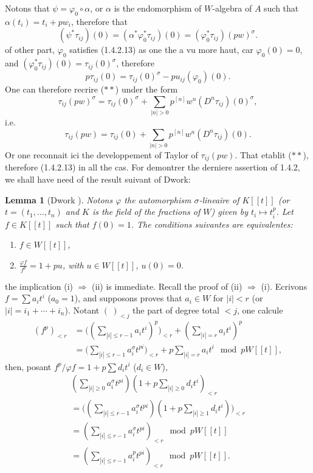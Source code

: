 \documentclass[12pt,a4paper]{article}
\theoremstyle{plain}
\newtheorem{lemma}[theorem]{Lemma}
\theoremstyle{definition}
\theoremstyle{remark}
\begin{document}
Notons that $\psi = \varphi_0 \circ \alpha$, or $\alpha$ is the endomorphism of $W$-algebra of $A$ such that $\alpha(t_i) = t_i + pw_i$, therefore that
\[
(\psi^*\tau_{ij})(0) = (\alpha^*\varphi_0^*\tau_{ij})(0) = (\varphi_0^*\tau_{ij})(pw)^{\sigma}.
\]
of other part, $\varphi_0$ satisfies (1.4.2.13) as one the a vu more haut, car $\varphi_0(0) = 0$, and $(\varphi_0^*\tau_{ij})(0) = \tau_{ij}(0)^\sigma$, therefore
\[
p\tau_{ij}(0) = \tau_{ij}(0)^\sigma - pu_{ij}(\varphi_0)(0).
\]
One can therefore recrire ($\ast\ast$) under the form
\[
\tau_{ij}(pw)^\sigma = \tau_{ij}(0)^\sigma + \sum_{|n|>0} p^{[n]}w^n(D^n\tau_{ij})(0)^\sigma,
\]
i.e.
\[
\tau_{ij}(pw) = \tau_{ij}(0) + \sum_{|n|>0} p^{[n]}w^n(D^n\tau_{ij})(0).
\]
Or one reconnait ici the developpement of Taylor of $\tau_{ij}(pw)$. That etablit ($\ast\ast$), therefore (1.4.2.13) in all the cas. For demontrer the derniere assertion of 1.4.2, we shall have need of the result suivant of Dwork:

\begin{lemma}[Dwork {\cite[lemma 1]{Dwork1958}}]\label{lem:1.4.3}
Notons $\varphi$ the automorphism $\sigma$-lineaire of $K[[t]]$ (or $t = (t_1, \ldots, t_n)$ and $K$ is the field of the fractions of $W$) given by $t_i \mapsto t_i^p$. Let $f \in K[[t]]$ such that $f(0) = 1$. The conditions suivantes are equivalentes:
\begin{enumerate}[label=(\roman*)]
\item $f \in W[[t]]$,
\item $\displaystyle\frac{\varphi f}{f^p} = 1 + pu$, with $u \in W[[t]]$, $u(0) = 0$.
\end{enumerate}
\end{lemma}

the implication (i) $\Rightarrow$ (ii) is immediate. Recall the proof of (ii) $\Rightarrow$ (i). Ecrivons $f = \sum a_i t^i$ ($a_0 = 1$), and supposons proves that $a_i \in W$ for $|i| < r$ (or $|i| = i_1 + \cdots + i_n$). Notant $(~)_{<j}$ the part of degree total $< j$, one calcule
\begin{align*}
(f^p)_{<r} &= \bigl((\sum_{|i|\leqslant r-1} a_i t^i)^p\bigr)_{<r} + (\sum_{|i|=r} a_i t^i)^p \\
&= \bigl(\sum_{|i|\leqslant r-1} a_i^\sigma t^{pi}\bigr)_{<r} + p\sum_{|i|=r} a_i t^i \mod pW[[t]],
\end{align*}
then, posant $f^p/\varphi f = 1 + p\sum d_i t^i$ ($d_i \in W$),
\begin{multline*}
(\sum_{|i|\geqslant 0} a_i^\sigma t^{pi})(1 + p\sum_{|i|\geqslant 0} d_i t^i)_{<r} \\
= \bigl((\sum_{|i|\leqslant r-1} a_i^\sigma t^{pi})(1 + p\sum_{|i|\geqslant 1} d_i t^i)\bigr)_{<r} \\
= (\sum_{|i|\leqslant r-1} a_i^\sigma t^{pi})_{<r} \mod pW[[t]] \\
= (\sum_{|i|\leqslant r-1} a_i^p t^{pi})_{<r} \mod pW[[t]].
\end{multline*}
\end{document}
